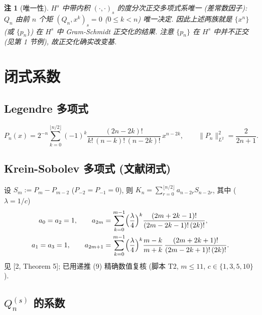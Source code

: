 \documentclass[UTF8]{ctexart}
\newtheorem{remark}[theorem]{注}
\begin{document}
\begin{remark}[唯一性]
	$H^s$ 中带内积 $(\cdot,\cdot)_s$ 的度分次正交多项式系唯一 (差常数因子):
	$Q_n$ 由前 $n$ 个矩 $(Q_n, x^k)_s = 0$ ($0 \leq k < n$) 唯一决定.
	因此上述两族就是 $\{x^n\}$ (或 $\{p_n\}$) 在 $H^s$ 中 Gram-Schmidt
	正交化的结果. 注意 $\{p_n\}$ 在 $H^s$ 中并不正交 (见第 1 节例),
	故正交化确实改变基.
\end{remark}

\section{闭式系数}

\subsection{Legendre 多项式}

\begin{equation}
	P_n(x) = 2^{-n} \sum_{k=0}^{\lfloor n/2 \rfloor} (-1)^k
		\frac{(2n-2k)!}{k!\,(n-k)!\,(n-2k)!}\, x^{n-2k},
	\qquad \|P_n\|_{L^2}^2 = \frac{2}{2n+1}.
\end{equation}

\subsection{Krein-Sobolev 多项式 (文献闭式)}

设 $S_m := P_m - P_{m-2}$ ($P_{-2}=P_{-1}=0$), 则
$K_n = \sum_{r=0}^{\lfloor n/2 \rfloor} a_{n-2r} S_{n-2r}$, 其中 ($\lambda = 1/c$)
\begin{align}
	a_0 = a_2 = 1, \qquad
	a_{2m} &= \sum_{k=0}^{m-1} \Bigl(\frac{\lambda}{4}\Bigr)^k
		\frac{(2m+2k-1)!}{(2m-2k-1)!\,(2k)!}, \\
	a_1 = a_3 = 1, \qquad
	a_{2m+1} &= \sum_{k=0}^{m-1} \Bigl(\frac{\lambda}{4}\Bigr)^k
		\frac{m-k}{m+k}\,
		\frac{(2m+2k+1)!}{(2m-2k+1)!\,(2k)!}.
\end{align}
见 [2, Theorem 5]; 已用递推 (9) 精确数值复核 (脚本 T2, $m \leq 11$,
$c \in \{1,3,5,10\}$).

\subsection{\texorpdfstring{$Q_n^{(s)}$}{Qns} 的系数}
\end{document}
